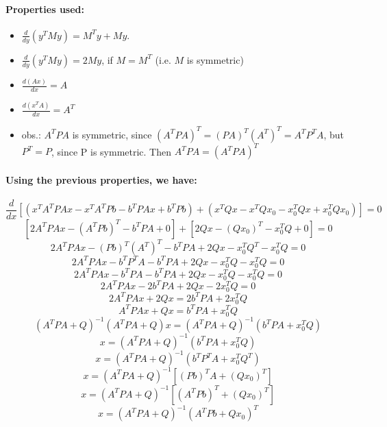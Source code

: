 \documentclass[a4paper]{article}    %
\begin{document}
\paragraph{Properties used:}
    \begin{itemize}
        \item $\frac{d}{dy}(y^TMy) = M^Ty + My$.
        \item $\frac{d}{dy}(y^TMy) = 2My$, if $M = M^T$ (i.e. $M$ is symmetric)
        \item $\frac{d(Ax)}{dx} = A$
        \item $\frac{d(x^TA)}{dx} = A^T$
        \item obs.: $A^TPA$ is symmetric, since $(A^TPA)^T = (PA)^T(A^T)^T = A^TP^TA$, but $P^T = P$, since P is symmetric. Then $A^TPA = (A^TPA)^T$
    \end{itemize}
\paragraph{Using the previous properties, we have:}
    \[\frac{d}{dx} [(x^TA^TPAx - x^TA^TPb -b^TPAx + b^TPb) + (x^TQx - x^TQx_0 - x_0^TQx + x_0^TQx_0)] = 0\]
    \[[2A^TPAx - (A^TPb)^T - b^TPA + 0] + [2Qx - (Qx_0)^T - x_0^TQ + 0] = 0\]
    \[2A^TPAx - (Pb)^T(A^T)^T - b^TPA + 2Qx - x_0^TQ^T - x_0^TQ = 0\]
    \[2A^TPAx - b^TP^TA - b^TPA + 2Qx - x_0^TQ - x_0^TQ = 0\]
    \[2A^TPAx - b^TPA - b^TPA + 2Qx - x_0^TQ - x_0^TQ = 0\]
    \[2A^TPAx - 2b^TPA + 2Qx - 2x_0^TQ = 0\]
    \[2A^TPAx + 2Qx = 2b^TPA + 2x_0^TQ\]
    \[A^TPAx + Qx = b^TPA + x_0^TQ\]
    \[(A^TPA + Q)^{-1}(A^TPA + Q)x = (A^TPA + Q)^{-1}(b^TPA + x_0^TQ)\]
    \[x = (A^TPA + Q)^{-1}(b^TPA + x_0^TQ)\]
    \[x = (A^TPA + Q)^{-1}(b^TP^TA + x_0^TQ^T)\]
    \[x = (A^TPA + Q)^{-1}[(Pb)^TA + (Qx_0)^T]\]
    \[x = (A^TPA + Q)^{-1}[(A^TPb)^T + (Qx_0)^T]\]
    \[\boxed{x = (A^TPA + Q)^{-1}(A^TPb + Qx_0)^T}\]
\end{document}
